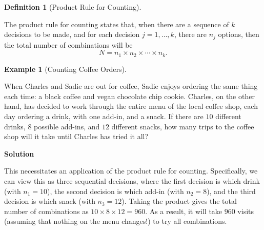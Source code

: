 \documentclass[
  letterpaper,
  DIV=11,
  numbers=noendperiod]{scrreprt}
\theoremstyle{definition}
\newtheorem{definition}{Definition}[chapter]
\theoremstyle{definition}
\theoremstyle{definition}
\newtheorem{example}{Example}[chapter]
\theoremstyle{remark}
\begin{document}
\begin{definition}[Product Rule for
Counting]\protect\hypertarget{def-product-rule-count}{}\label{def-product-rule-count}

The product rule for counting states that, when there are a sequence of
\(k\) decisions to be made, and for each decision \(j=1,\dots,k\), there
are \(n_j\) options, then the total number of combinations will be
\[N = n_1\times n_2\times\cdots\times n_k.\]

\end{definition}

\begin{example}[Counting Coffee
Orders]\protect\hypertarget{exm-counting-coffee-orders}{}\label{exm-counting-coffee-orders}

When Charles and Sadie are out for coffee, Sadie enjoys ordering the
same thing each time: a black coffee and vegan chocolate chip cookie.
Charles, on the other hand, has decided to work through the entire menu
of the local coffee shop, each day ordering a drink, with one add-in,
and a snack. If there are \(10\) different drinks, \(8\) possible
add-ins, and \(12\) different snacks, how many trips to the coffee shop
will it take until Charles has tried it all?

\begin{tcolorbox}[enhanced jigsaw, colback=white, breakable, rightrule=.15mm, leftrule=.75mm, toprule=.15mm, left=2mm, arc=.35mm, opacityback=0, bottomrule=.15mm]

\vspace{-3mm}\textbf{Solution}\vspace{3mm}

This necessitates an application of the product rule for counting.
Specifically, we can view this as three sequential decisions, where the
first decision is which drink (with \(n_1 = 10\)), the second decision
is which add-in (with \(n_2 = 8\)), and the third decision is which
snack (with \(n_3 = 12\)). Taking the product gives the total number of
combinations as \(10\times 8\times 12 = 960\). As a result, it will take
\(960\) visits (assuming that nothing on the menu changes!) to try all
combinations.

\end{tcolorbox}

\end{example}
\end{document}

